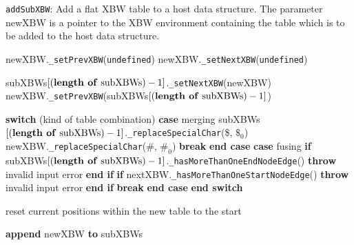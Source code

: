 \documentclass[a4paper,12pt,twoside,BCOR=10mm]{scrbook}
\newcommand{\StateInd}{\State\hspace{0.6cm}}
\newcommand{\StateIndd}{\State\hspace{1.2cm}}
\newcommand{\StateInddd}{\State\hspace{1.8cm}}
\begin{document}
\begin{algorithm}
\caption[\texttt{addSubXBW}: Add a table to a host data structure]{\texttt{addSubXBW}: Add a flat XBW table to a host data structure. The parameter newXBW is a pointer to the XBW environment containing the table which is to be added to the host data structure.}
\label{alg:addSubXBW}
\begin{algorithmic}[1]

\State newXBW.\texttt{\_setPrevXBW}(\texttt{undefined})
\State newXBW.\texttt{\_setNextXBW}(\texttt{undefined})

\State \phantom{nl}

	\State subXBWs$[ (\textrm{\textbf{length of} subXBWs}) - 1 ]$.\texttt{\_setNextXBW}(newXBW)
	\State newXBW.\texttt{\_setPrevXBW}(subXBWs$[ (\textrm{\textbf{length of} subXBWs}) - 1 ]$)

	\State \phantom{nl}

	\State \textbf{switch} (kind of table combination)
		\StateInd \textbf{case} merging
			\StateIndd subXBWs$[ (\textrm{\textbf{length of} subXBWs}) - 1 ]$.\texttt{\_replaceSpecialChar}(\texttt{\textquotesingle}\$\texttt{\textquotesingle}, \texttt{\textquotesingle}$\$_0$\texttt{\textquotesingle})
			\StateIndd newXBW.\texttt{\_replaceSpecialChar}(\texttt{\textquotesingle}$\#$\texttt{\textquotesingle}, \texttt{\textquotesingle}$\#_0$\texttt{\textquotesingle})
			\StateIndd \textbf{break}
		\StateInd \textbf{end case}
		\StateInd \textbf{case} fusing
			\StateIndd \textbf{if} subXBWs$[ (\textrm{\textbf{length of} subXBWs}) - 1 ]$.\texttt{\_hasMoreThanOneEndNodeEdge}()
				\StateInddd \textbf{throw} invalid input error
			\StateIndd \textbf{end if}
			\StateIndd \textbf{if} nextXBW.\texttt{\_hasMoreThanOneStartNodeEdge}()
				\StateInddd \textbf{throw} invalid input error
			\StateIndd \textbf{end if}
			\StateIndd \textbf{break}
		\StateInd \textbf{end case}
	\State \textbf{end switch}
\EndIf

\State \phantom{nl}

\State reset current positions within the new table to the start

\State \phantom{nl}

\State \textbf{append} newXBW \textbf{to} subXBWs

\end{algorithmic}
\end{algorithm}
\end{document}
